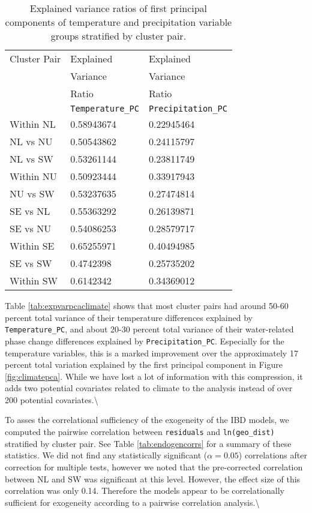 \documentclass[
  letterpaper,
  DIV=11,
  numbers=noendperiod]{scrreprt}
\begin{document}
\begin{table}[H]
\centering
\caption{Explained variance ratios of first principal components of temperature and precipitation variable groups stratified by cluster pair.}
\begin{tabular}{lll}
\hline
Cluster Pair & Explained & Explained \\
 & Variance & Variance \\
  & Ratio & Ratio \\
 & \texttt{Temperature\_PC} & \texttt{Precipitation\_PC} \\
 \hline
Within NL & 0.58943674 &  0.22945464 \\
NL vs NU & 0.50543862 &  0.24115797 \\
NL vs SW & 0.53261144 &  0.23811749 \\
Within NU & 0.50923444 &  0.33917943 \\
NU vs SW & 0.53237635 &  0.27474814 \\
SE vs NL & 0.55363292 &  0.26139871 \\
SE vs NU & 0.54086253 &  0.28579717 \\
Within SE & 0.65255971 &  0.40494985 \\
SE vs SW & 0.4742398 &  0.25735202 \\
Within  SW & 0.6142342 &  0.34369012 \\
\hline
\end{tabular}

\end{table}

Table \ref{tab:expvarpcaclimate} shows that most cluster pairs had
around 50-60 percent total variance of their temperature differences
explained by \texttt{Temperature\_PC}, and about 20-30 percent total
variance of their water-related phase change differences explained by
\texttt{Precipitation\_PC}. Especially for the temperature variables,
this is a marked improvement over the approximately 17 percent total
variation explained by the first principal component in Figure
\ref{fig:climatepca}. While we have lost a lot of information with this
compression, it adds two potential covariates related to climate to the
analysis instead of over 200 potential covariates.\textbackslash{}

To asses the correlational sufficiency of the exogeneity of the IBD
models, we computed the pairwise correlation between \texttt{residuals}
and \texttt{ln(geo\_dist)} stratified by cluster pair. See Table
\ref{tab:endogencorrs} for a summary of these statistics. We did not
find any statistically significant (\(\alpha=0.05\)) correlations after
correction for multiple tests, however we noted that the pre-corrected
correlation between NL and SW was significant at this level. However,
the effect size of this correlation was only 0.14. Therefore the models
appear to be correlationally sufficient for exogeneity according to a
pairwise correlation analysis.\textbackslash{}
\end{document}
